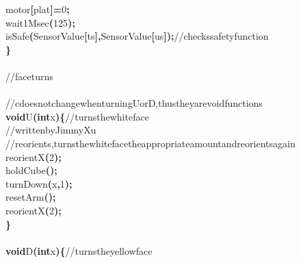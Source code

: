 \documentclass[a4paper, 10pt]{article}
\newcommand\SPC{\hspace*{0.6em}}
\newcommand\TAB{\hspace*{1.2em}}
\newcommand{\CppAComment}[1]{\textcolor[rgb]{0,0.5,0}{\colorbox[rgb]{1,1,1}{#1}}}
\newcommand{\CppAIdentifier}[1]{#1}
\newcommand{\CppANumber}[1]{\textcolor[rgb]{0,0,1}{\colorbox[rgb]{1,1,1}{#1}}}
\newcommand{\CppAReservedWord}[1]{\textbf{\colorbox[rgb]{1,1,1}{#1}}}
\newcommand{\CppASpace}[1]{\colorbox[rgb]{1,1,1}{#1}}
\newcommand{\CppASymbol}[1]{\textbf{\textcolor[rgb]{1,0,0}{\colorbox[rgb]{1,1,1}{#1}}}}
\begin{document}
\begin{ttfamily}
\CppASpace{\TAB }\CppAIdentifier{motor}\CppASymbol{[}\CppAIdentifier{plat}\CppASymbol{]}\CppASymbol{=}\CppANumber{0}\CppASymbol{;}\\
\CppASpace{\TAB }\CppAIdentifier{wait1Msec}\CppASymbol{(}\CppANumber{125}\CppASymbol{)}\CppASymbol{;}\\
\CppASpace{\TAB }\CppAIdentifier{isSafe}\CppASymbol{(}\CppAIdentifier{SensorValue}\CppASymbol{[}\CppAIdentifier{ts}\CppASymbol{]}\CppASymbol{,}\CppASpace{\SPC }\CppAIdentifier{SensorValue}\CppASymbol{[}\CppAIdentifier{us}\CppASymbol{]}\CppASymbol{)}\CppASymbol{;}\CppASpace{\SPC }\CppAComment{//\SPC checks\SPC safety\SPC function}\\
\CppASymbol{\}}\\
\\
\CppAComment{//face\SPC turns}\\
\\
\CppAComment{//\SPC c\SPC does\SPC not\SPC change\SPC when\SPC turning\SPC U\SPC or\SPC D,\SPC thus\SPC they\SPC are\SPC void\SPC functions}\\
\CppAReservedWord{void}\CppASpace{\SPC }\CppAIdentifier{U}\CppASymbol{(}\CppAReservedWord{int}\CppASpace{\SPC }\CppAIdentifier{x}\CppASymbol{)}\CppASymbol{\{}\CppASpace{\SPC }\CppAComment{//\SPC turns\SPC the\SPC white\SPC face}\\
\CppASpace{\TAB }\CppAComment{//\SPC written\SPC by\SPC Jimmy\SPC Xu}\\
\CppASpace{\TAB }\CppAComment{//\SPC reorients,\SPC turns\SPC the\SPC white\SPC face\SPC the\SPC appropriate\SPC amount\SPC and\SPC reorients\SPC again}\\
\CppASpace{\TAB }\CppAIdentifier{reorientX}\CppASymbol{(}\CppANumber{2}\CppASymbol{)}\CppASymbol{;}\\
\CppASpace{\TAB }\CppAIdentifier{holdCube}\CppASymbol{(}\CppASymbol{)}\CppASymbol{;}\\
\CppASpace{\TAB }\CppAIdentifier{turnDown}\CppASymbol{(}\CppAIdentifier{x}\CppASymbol{,}\CppASpace{\SPC }\CppANumber{1}\CppASymbol{)}\CppASymbol{;}\\
\CppASpace{\TAB }\CppAIdentifier{resetArm}\CppASymbol{(}\CppASymbol{)}\CppASymbol{;}\\
\CppASpace{\TAB }\CppAIdentifier{reorientX}\CppASymbol{(}\CppANumber{2}\CppASymbol{)}\CppASymbol{;}\\
\CppASymbol{\}}\\
\\
\CppAReservedWord{void}\CppASpace{\SPC }\CppAIdentifier{D}\CppASymbol{(}\CppAReservedWord{int}\CppASpace{\SPC }\CppAIdentifier{x}\CppASymbol{)}\CppASymbol{\{}\CppASpace{\SPC }\CppAComment{//\SPC turns\SPC the\SPC yellow\SPC face}\\

\end{ttfamily}
\end{document}
